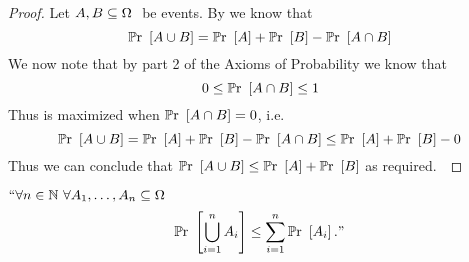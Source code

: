         \begin{proof}
            Let $A, B \subseteq \Omega \ $ be events. By 
            we know that 
            \begin{equation}
                \mathbb{P}\mathrm{r}~\left[A \cup B\right] = \mathbb{P}\mathrm{r}~\left[A\right] + \mathbb{P}\mathrm{r}~\left[B\right] - \mathbb{P}\mathrm{r}~\left[A \cap B\right]
                \label{Union Bound Corollary 1}
            \end{equation}
            We now note that by part 2 of the Axioms of Probability we know that
            \[
                0 \le \mathbb{P}\mathrm{r}~\left[A \cap B\right] \le 1
            \]
            Thus  is maximized when $\mathbb{P}\mathrm{r}~\left[A \cap B\right] = 0$, i.e.
            \[
                \mathbb{P}\mathrm{r}~\left[A \cup B\right] = \mathbb{P}\mathrm{r}~\left[A\right] + \mathbb{P}\mathrm{r}~\left[B\right] - \mathbb{P}\mathrm{r}~\left[A \cap B\right] \le \mathbb{P}\mathrm{r}~\left[A\right] + \mathbb{P}\mathrm{r}~\left[B\right] - 0
            \]
            Thus we can conclude that $\mathbb{P}\mathrm{r}~\left[A \cup B\right] \le \mathbb{P}\mathrm{r}~\left[A\right] + \mathbb{P}\mathrm{r}~\left[B\right]$ as required.~\QED
        \end{proof}
        \begin{theorem}
            \label{Union Bound}
            $``\forall n \in \mathbb{N} \ \forall A_1, \dots, A_n \subseteq \Omega \ $
            \[
                \mathbb{P}\mathrm{r}~\left[\displaystyle\bigcup_{i = 1}^{n} A_i\right] \le \sum_{i = 1}^{n} \mathbb{P}\mathrm{r}~\left[A_i\right]."
            \]
        \end{theorem}
